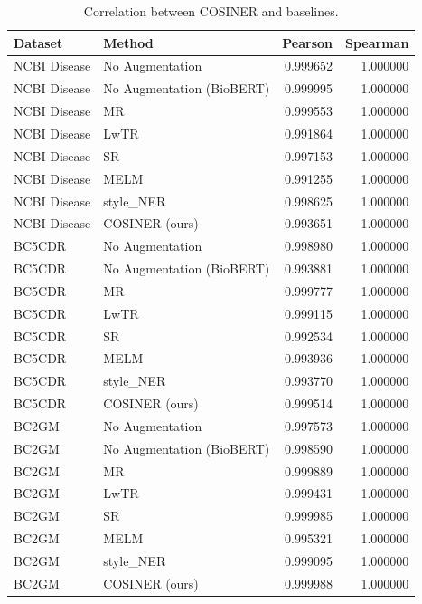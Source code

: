 \begin{table}
        \footnotesize
        \centering
        \caption{Correlation between COSINER and baselines.}\begin{tabular}{llrr}
\toprule
Dataset & Method & Pearson & Spearman \\
\midrule
NCBI Disease & No Augmentation & 0.999652 & 1.000000 \\
NCBI Disease & No Augmentation (BioBERT) & 0.999995 & 1.000000 \\
NCBI Disease & MR & 0.999553 & 1.000000 \\
NCBI Disease & LwTR & 0.991864 & 1.000000 \\
NCBI Disease & SR & 0.997153 & 1.000000 \\
NCBI Disease & MELM & 0.991255 & 1.000000 \\
NCBI Disease & style\_NER & 0.998625 & 1.000000 \\
NCBI Disease & COSINER (ours) & 0.993651 & 1.000000 \\
BC5CDR & No Augmentation & 0.998980 & 1.000000 \\
BC5CDR & No Augmentation (BioBERT) & 0.993881 & 1.000000 \\
BC5CDR & MR & 0.999777 & 1.000000 \\
BC5CDR & LwTR & 0.999115 & 1.000000 \\
BC5CDR & SR & 0.992534 & 1.000000 \\
BC5CDR & MELM & 0.993936 & 1.000000 \\
BC5CDR & style\_NER & 0.993770 & 1.000000 \\
BC5CDR & COSINER (ours) & 0.999514 & 1.000000 \\
BC2GM & No Augmentation & 0.997573 & 1.000000 \\
BC2GM & No Augmentation (BioBERT) & 0.998590 & 1.000000 \\
BC2GM & MR & 0.999889 & 1.000000 \\
BC2GM & LwTR & 0.999431 & 1.000000 \\
BC2GM & SR & 0.999985 & 1.000000 \\
BC2GM & MELM & 0.995321 & 1.000000 \\
BC2GM & style\_NER & 0.999095 & 1.000000 \\
BC2GM & COSINER (ours) & 0.999988 & 1.000000 \\
\bottomrule
\end{tabular}
\end{table}